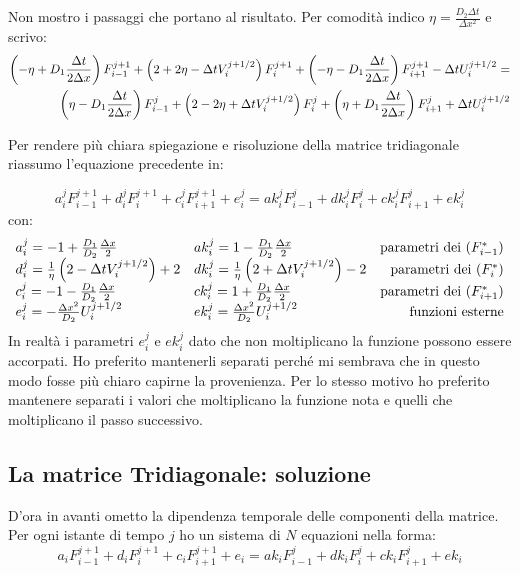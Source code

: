 Non mostro i passaggi che portano al risultato. Per comodit\`a indico $\eta = \frac {D_2 \Delta t}{\Delta x^2}$ e scrivo:
\begin{equation}
  \begin{aligned}
    \left( -\eta+D_1\frac{\Delta t}{2\Delta x} \right)F_{i-1}^{j+1} + \left( 2 + 2\eta- \Delta t V_i^{j+1/2} \right) F^{j+1}_i + \left( -\eta-D_1\frac{\Delta t}{2\Delta x} \right)F_{i+1}^{j+1} - \Delta t U_i^{j+1/2} = \\
    \left( \eta-D_1\frac{\Delta t}{2\Delta x} \right)F_{i-1}^{j} + \left( 2-2\eta+\Delta t V_i^{j+1/2} \right) F^{j}_i + \left( \eta +D_1\frac{\Delta t}{2\Delta x} \right)F_{i+1}^{j} + \Delta t U_i^{j+1/2}
  \end{aligned}
\end{equation}

Per rendere pi\`u chiara spiegazione e risoluzione della matrice tridiagonale riassumo l'equazione precedente in:

\begin{equation}
  a_i^j F_{i-1}^{j+1} + d_i^j F^{j+1}_i + c_i^j F_{i+1}^{j+1} + e_i^j = 
  ak_i^j F_{i-1}^{j} + dk_i^j F^{j}_i + ck_i^j F_{i+1}^{j} + ek_i^j
\end{equation}
con:
\begin{equation}\label{eq:pararametri}
  \begin{array}{ll r}
    a_i^j = -1+\frac{D_1}{D_2}\frac{\Delta x}2			& ak_i^j =1-\frac{D_1}{D_2}\frac{\Delta x}2			& \text{parametri dei }(F^*_{i-1})\\
    d_i^j = \frac1\eta\left( 2-\Delta t V_i^{j+1/2} \right) +2	& dk_i^j = \frac1\eta\left( 2+\Delta tV_i^{j+1/2} \right) -2	& \text{parametri dei }(F^*_{i})\\
    c_i^j = -1-\frac{D_1}{D_2}\frac{\Delta x}2			& ck_i^j =1+\frac{D_1}{D_2}\frac{\Delta x}2			& \text{parametri dei }(F^*_{i+1})\\
    e_i^j = -\frac{\Delta x^2}{D_2} U_i^{j+1/2}			& ek_i^j =\frac{\Delta x^2}{D_2} U_i^{j+1/2}		& \text{funzioni esterne}
  \end{array}
\end{equation}
In realt\`a i parametri $e_i^j$ e $ek_i^j$ dato che non moltiplicano la funzione possono essere accorpati. Ho preferito mantenerli separati perch\'e mi sembrava che in questo modo fosse pi\`u chiaro capirne la provenienza. Per lo stesso motivo ho preferito mantenere separati i valori che moltiplicano la funzione nota e quelli che moltiplicano il passo successivo.


\subsection{La matrice Tridiagonale: soluzione}\label{section:soluzionetri}
D'ora in avanti ometto la dipendenza temporale delle componenti della matrice. Per ogni istante di tempo $j$ ho un sistema di $N$ equazioni nella forma:
\begin{equation}
  a_{i} F_{i-1}^{j+1}+d_i F_{i}^{j+1} +c_{i}F_{i+1}^{j+1}  + e_i= 
  ak_i F_{i-1}^{j}+ dk_i F_{i}^{j} + ck_i F_{i+1}^{j} + ek_i
\end{equation}

